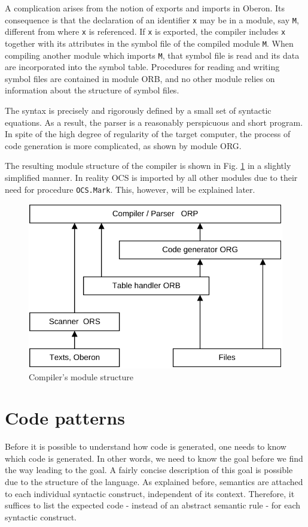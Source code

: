 A complication arises from the notion of exports and imports in Oberon. Its consequence is that the
declaration of an identifier \verb|x| may be in a module, say \verb|M|, different from where \verb|x|
is referenced. If \verb|x| is exported, the compiler includes \verb|x| together with its attributes
in the symbol file of the compiled module \verb|M|. When compiling another module which imports
\verb|M|, that symbol file is read and its data are incorporated into the symbol table. Procedures
for reading and writing symbol files are contained in module ORB, and no other module relies on
information about the structure of symbol files.

The syntax is precisely and rigorously defined by a small set of syntactic equations. As a result,
the parser is a reasonably perspicuous and short program. In spite of the high degree of regularity
of the target computer, the process of code generation is more complicated, as shown by module ORG.

The resulting module structure of the compiler is shown in Fig. \ref{fig:modstruct} in a slightly
simplified manner.  In reality OCS is imported by all other modules due to their need for procedure
\verb|OCS.Mark|. This, however, will be explained later.
\begin{figure}[h!]
  \centering
  \includegraphics[width=.75\textwidth]{i/C/1.png}
  \caption{Compiler's module structure}
  \label{fig:modstruct}
\end{figure}

\section{Code patterns}
\label{sec:codeptn}
Before it is possible to understand how code is generated, one needs to know which code is
generated. In other words, we need to know the goal before we find the way leading to the goal. A
fairly concise description of this goal is possible due to the structure of the language. As explained
before, semantics are attached to each individual syntactic construct, independent of its context.
Therefore, it suffices to list the expected code - instead of an abstract semantic rule - for each
syntactic construct.

